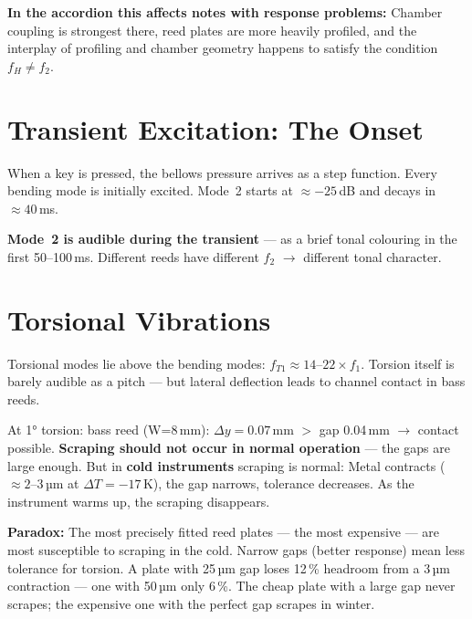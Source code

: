 \documentclass[11pt,a4paper]{article}
\begin{document}
\begin{tcolorbox}[colframe=keygreen, colback=green!5!white]
\textbf{In the accordion this affects notes with response problems:}
Chamber coupling is strongest there, reed plates are more heavily profiled,
and the interplay of profiling and chamber geometry happens to satisfy the
condition $f_H \neq f_2$.
\end{tcolorbox}

\section{Transient Excitation: The Onset}

When a key is pressed, the bellows pressure arrives as a step function.
Every bending mode is initially excited.
Mode~2 starts at $\approx -25$\,dB and decays in $\approx 40$\,ms.

\begin{tcolorbox}[colframe=keygreen, colback=green!5!white]
\textbf{Mode~2 is audible during the transient} --- as a brief tonal colouring
in the first 50--100\,ms. Different reeds have different $f_2$
$\to$ different tonal character.
\end{tcolorbox}

\section{Torsional Vibrations}

Torsional modes lie above the bending modes: $f_{T1} \approx 14$--$22 \times f_1$.
Torsion itself is barely audible as a pitch --- but lateral deflection
leads to channel contact in bass reeds.

At 1° torsion: bass reed (W=8\,mm): $\Delta y = 0{.}07$\,mm $>$ gap 0.04\,mm
$\to$ contact possible. \textbf{Scraping should not occur in normal operation} ---
the gaps are large enough. But in \textbf{cold instruments} scraping is normal:
Metal contracts ($\approx 2$--$3$\,µm at $\Delta T = -17$\,K),
the gap narrows, tolerance decreases. As the instrument warms up, the scraping disappears.

\begin{tcolorbox}[colframe=keygreen, colback=green!5!white]
\textbf{Paradox:} The most precisely fitted reed plates --- the most expensive ---
are most susceptible to scraping in the cold. Narrow gaps (better response)
mean less tolerance for torsion. A plate with 25\,µm gap loses
12\,\% headroom from a 3\,µm contraction --- one with 50\,µm only 6\,\%.
The cheap plate with a large gap never scrapes; the expensive one with the perfect gap
scrapes in winter.
\end{tcolorbox}
\end{document}
